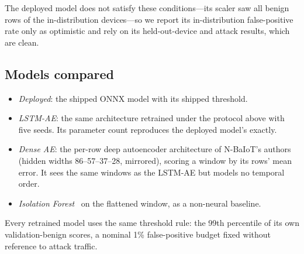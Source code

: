 The deployed model does not satisfy these conditions---its scaler saw all
benign rows of the in-distribution devices---so we report its in-distribution
false-positive rate only as optimistic and rely on its held-out-device and
attack results, which are clean.

\subsection{Models compared}
\begin{itemize}
\item \emph{Deployed}: the shipped ONNX model with its shipped threshold.
\item \emph{LSTM-AE}: the same architecture retrained under the protocol above
  with five seeds. Its parameter count reproduces the deployed model's exactly.
\item \emph{Dense AE}: the per-row deep autoencoder architecture of N-BaIoT's
  authors~\cite{meidan2018nbaiot} (hidden widths 86--57--37--28, mirrored),
  scoring a window by its rows' mean error. It sees the same windows as the
  LSTM-AE but models no temporal order.
\item \emph{Isolation Forest}~\cite{liu2008iforest} on the flattened window,
  as a non-neural baseline.
\end{itemize}
Every retrained model uses the same threshold rule: the 99th percentile of its
own validation-benign scores, a nominal 1\% false-positive budget fixed without
reference to attack traffic.

